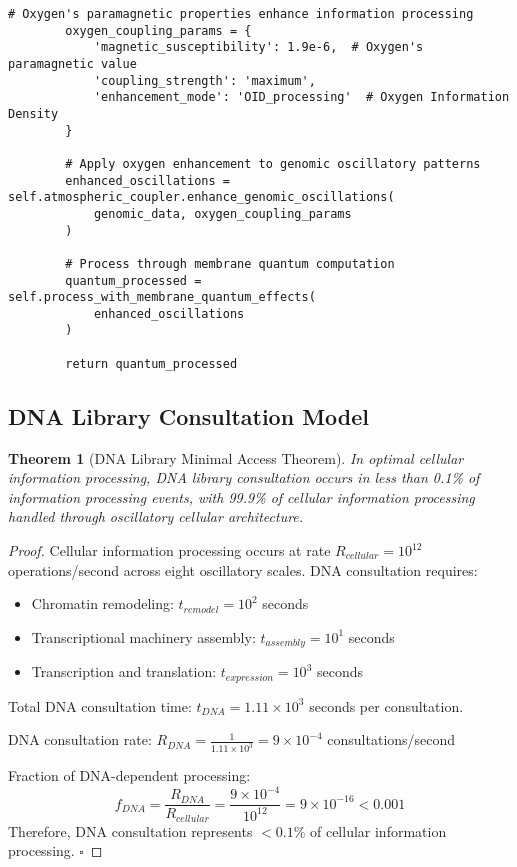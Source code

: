 \documentclass[12pt,a4paper]{article}
\newtheorem{theorem}{Theorem}
\begin{document}
\begin{lstlisting}[style=pythonstyle, caption=Membrane Quantum Genomic Processor]
        # Oxygen's paramagnetic properties enhance information processing
        oxygen_coupling_params = {
            'magnetic_susceptibility': 1.9e-6,  # Oxygen's paramagnetic value
            'coupling_strength': 'maximum',
            'enhancement_mode': 'OID_processing'  # Oxygen Information Density
        }
        
        # Apply oxygen enhancement to genomic oscillatory patterns
        enhanced_oscillations = self.atmospheric_coupler.enhance_genomic_oscillations(
            genomic_data, oxygen_coupling_params
        )
        
        # Process through membrane quantum computation
        quantum_processed = self.process_with_membrane_quantum_effects(
            enhanced_oscillations
        )
        
        return quantum_processed
\end{lstlisting}

\subsection{DNA Library Consultation Model}

\begin{theorem}[DNA Library Minimal Access Theorem]
In optimal cellular information processing, DNA library consultation occurs in less than 0.1\% of information processing events, with 99.9\% of cellular information processing handled through oscillatory cellular architecture.
\end{theorem}

\begin{proof}
Cellular information processing occurs at rate $R_{cellular} = 10^{12}$ operations/second across eight oscillatory scales. DNA consultation requires:
\begin{itemize}
\item Chromatin remodeling: $t_{remodel} = 10^2$ seconds
\item Transcriptional machinery assembly: $t_{assembly} = 10^1$ seconds  
\item Transcription and translation: $t_{expression} = 10^3$ seconds
\end{itemize}

Total DNA consultation time: $t_{DNA} = 1.11 \times 10^3$ seconds per consultation.

DNA consultation rate: $R_{DNA} = \frac{1}{1.11 \times 10^3} = 9 \times 10^{-4}$ consultations/second

Fraction of DNA-dependent processing:
\begin{equation}
f_{DNA} = \frac{R_{DNA}}{R_{cellular}} = \frac{9 \times 10^{-4}}{10^{12}} = 9 \times 10^{-16} < 0.001
\end{equation}
Therefore, DNA consultation represents $<0.1\%$ of cellular information processing. $\square$
\end{proof}
\end{document}
